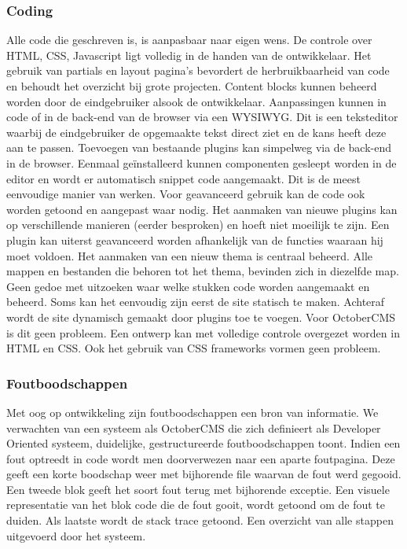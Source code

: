 \subsubsection{Coding}
Alle code die geschreven is, is aanpasbaar naar eigen wens. De controle over HTML, CSS, Javascript ligt volledig in de handen van de ontwikkelaar. Het gebruik van partials en layout pagina's bevordert de herbruikbaarheid van code en behoudt het overzicht bij grote projecten. Content blocks kunnen beheerd worden door de eindgebruiker alsook de ontwikkelaar. Aanpassingen kunnen in code of in de back-end van de browser via een WYSIWYG. Dit is een teksteditor waarbij de eindgebruiker de opgemaakte tekst direct ziet en de kans heeft deze aan te passen.
\newline\newline
Toevoegen van bestaande plugins kan simpelweg via de back-end in de browser. Eenmaal geïnstalleerd kunnen componenten gesleept worden in de editor en wordt er automatisch snippet code aangemaakt. Dit is de meest eenvoudige manier van werken. Voor geavanceerd gebruik kan de code ook worden getoond en aangepast waar nodig. Het aanmaken van nieuwe plugins kan op verschillende manieren (eerder besproken) en hoeft niet moeilijk te zijn. Een plugin kan uiterst geavanceerd worden afhankelijk van de functies waaraan hij moet voldoen.
\newline\newline
Het aanmaken van een nieuw thema is centraal beheerd. Alle mappen en bestanden die behoren tot het thema, bevinden zich in diezelfde map. Geen gedoe met uitzoeken waar welke stukken code worden aangemaakt en beheerd. Soms kan het eenvoudig zijn eerst de site statisch te maken. Achteraf wordt de site dynamisch gemaakt door plugins toe te voegen. Voor OctoberCMS is dit geen probleem. Een ontwerp kan met volledige controle overgezet worden in HTML en CSS. Ook het gebruik van CSS frameworks vormen geen probleem.

\subsubsection{Foutboodschappen}
Met oog op ontwikkeling zijn foutboodschappen een bron van informatie. We verwachten van een systeem als OctoberCMS die zich definieert als Developer Oriented systeem, duidelijke, gestructureerde foutboodschappen toont.
\newline\newline
Indien een fout optreedt in code wordt men doorverwezen naar een aparte foutpagina. Deze geeft een korte boodschap weer met bijhorende file waarvan de fout werd gegooid. Een tweede blok geeft het soort fout terug met bijhorende exceptie. Een visuele representatie van het blok code die de fout gooit, wordt getoond om de fout te duiden. Als laatste wordt de stack trace getoond. Een overzicht van alle stappen uitgevoerd door het systeem.

